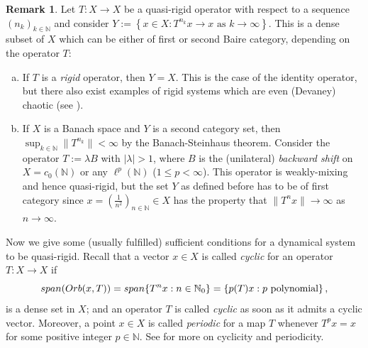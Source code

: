 \documentclass[openright,11pt]{article}
\theoremstyle{plain}
\theoremstyle{definition}
\newtheorem{remark}[theorem]{Remark}
\newcommand{\NN}{\mathbb{N}}
\newcommand{\orb}{\textup{Orb}}
\newcommand{\lspan}{\textup{span}}
\begin{document}
\begin{remark}
	Let $T:X\longrightarrow X$ be a quasi-rigid operator with respect to a sequence $(n_k)_{k\in\NN}$ and consider $Y := \left\{ x \in X : T^{n_k}x \to x \text{ as } k\to\infty \right\}$. This is a dense subset of $X$ which can be either of first or second Baire category, depending on the operator $T$:\newpage
	\begin{enumerate}[(a)]
		\item If $T$ is a {\em rigid} operator, then $Y=X$. This is the case of the identity operator, but there also exist examples of rigid systems which are even (Devaney) chaotic (see \cite{EisGri2011}).
		
		\item If $X$ is a Banach space and $Y$ is a second category set, then $\sup_{k \in \NN} \|T^{n_k}\| < \infty$ by the Banach-Steinhaus theorem. Consider the operator $T:=\lambda B$ with $|\lambda|>1$, where $B$ is the (unilateral) {\em backward shift} on $X=c_0(\NN)$ or any $\ell^p(\NN)$ ($1\leq p<\infty$). This operator is weakly-mixing and hence quasi-rigid, but the set $Y$ as defined before has to be of first category since $x=(\frac{1}{n^2})_{n\in\NN} \in X$ has the property that $\|T^n x\| \to \infty$ as $n \to \infty$.
	\end{enumerate}
\end{remark}

Now we give some (usually fulfilled) sufficient conditions for a dynamical system to be quasi-rigid. Recall that a vector $x \in X$ is called {\em cyclic} for an operator $T:X\longrightarrow X$ if
\[
\lspan(\orb(x,T)) = \lspan\{T^nx : n \in \NN_0\} = \left\{ p(T)x : p \text{ polynomial} \right\},
\]
is a dense set in $X$; and an operator $T$ is called {\em cyclic} as soon as it admits a cyclic vector. Moreover, a point $x \in X$ is called {\em periodic} for a map $T$ whenever $T^px=x$ for some positive integer $p\in\NN$. See \cite{BaMa2009_book,GrPe2011_book} for more on cyclicity and periodicity.
\end{document}
